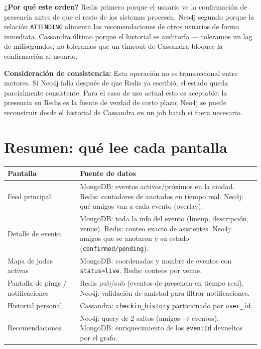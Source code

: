 \documentclass[12pt, a4paper]{article}
\newcommand{\code}[1]{\texttt{#1}}
\begin{document}
\textbf{¿Por qué este orden?}
Redis primero porque el usuario ve la confirmación de presencia antes de
que el resto de los sistemas procesen. Neo4j segundo porque la relación
\code{ATTENDING} alimenta las recomendaciones de otros usuarios de forma
inmediata. Cassandra último porque el historial es auditoría — toleramos
un lag de milisegundos; no toleramos que un timeout de Cassandra bloquee
la confirmación al usuario.

\vspace{0.5em}
\textbf{Consideración de consistencia:}
Esta operación no es transaccional entre motores. Si Neo4j falla después de
que Redis ya escribió, el estado queda parcialmente consistente. Para el
caso de uso actual esto es aceptable: la presencia en Redis es la fuente
de verdad de corto plazo; Neo4j se puede reconstruir desde el historial de
Cassandra en un job batch si fuera necesario.

\section{Resumen: qué lee cada pantalla}
\label{sec:pantallas}

\begin{tabularx}{\textwidth}{@{}lX@{}}
  \toprule
  \textbf{Pantalla}       & \textbf{Fuente de datos} \\
  \midrule
  Feed principal
    & MongoDB: eventos activos/próximos en la ciudad. Redis: contadores de
      anotados en tiempo real. Neo4j: qué amigos van a cada evento (overlay). \\
  \addlinespace
  Detalle de evento
    & MongoDB: toda la info del evento (lineup, descripción, venue). Redis:
      conteo exacto de asistentes. Neo4j: amigos que se anotaron y su estado
      (\code{confirmed/pending}). \\
  \addlinespace
  Mapa de jodas activas
    & MongoDB: coordenadas y nombre de eventos con \code{status=live}.
      Redis: conteos por venue. \\
  \addlinespace
  Pantalla de pings / notificaciones
    & Redis pub/sub (eventos de presencia en tiempo real).
      Neo4j: validación de amistad para filtrar notificaciones. \\
  \addlinespace
  Historial personal
    & Cassandra: \code{checkin\_history} particionado por \code{user\_id}. \\
  \addlinespace
  Recomendaciones
    & Neo4j: query de 2 saltos (amigos → eventos). MongoDB: enriquecimiento
      de los \code{eventId} devueltos por el grafo. \\
  \bottomrule
\end{tabularx}
\end{document}
